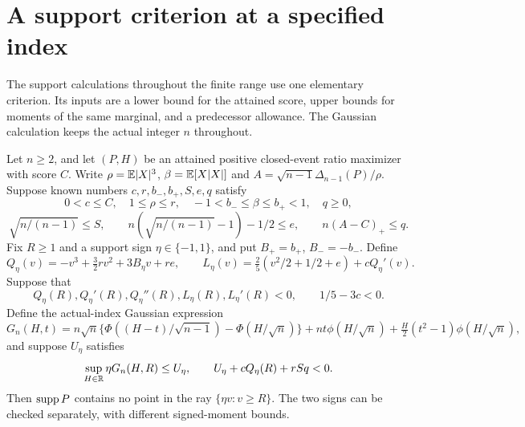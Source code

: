\section{A support criterion at a specified index}
\label{ext:direct-gaussian-support}
The support calculations throughout the finite range use one elementary
criterion. Its inputs are a lower bound for the attained score, upper
bounds for moments of the same marginal, and a predecessor allowance.
The Gaussian calculation keeps the actual integer $n$ throughout.

\begin{lemma}
\label{ext:direct-gaussian-support-criterion}
Let $n\ge2$, and let $(P,H)$ be an attained positive closed-event
ratio maximizer with score $C$. Write
$\rho=\mathbb E|X|^3$, $\beta=\mathbb E[X|X|]$ and
$A=\sqrt{n-1}\Delta_{n-1}(P)/\rho$.
Suppose known numbers $c,r,b_-,b_+,S,e,q$ satisfy
\[
 0<c\le C,\quad 1\le\rho\le r,\quad
 -1<b_-\le\beta\le b_+<1,\quad q\ge0,
\]
\[
 \sqrt{n/(n-1)}\le S,\qquad
 n(\sqrt{n/(n-1)}-1)-1/2\le e,\qquad
 n(A-C)_+\le q.
\]
Fix $R\ge1$ and a support sign $\eta\in\{-1,1\}$, and put
$B_+=b_+$, $B_-=-b_-$. Define
\[
 Q_\eta(v)=-v^3+\tfrac32rv^2+3B_\eta v+re,
 \qquad
 L_\eta(v)=\tfrac25(v^2/2+1/2+e)+cQ_\eta'(v).
\]
Suppose that
\begin{equation}\label{ext:direct-support-ray-gates}
 Q_\eta(R),Q_\eta'(R),Q_\eta''(R),
 L_\eta(R),L_\eta'(R)<0,
 \qquad 1/5-3c<0.
\end{equation}
Define the actual-index Gaussian expression
\[
 G_n(H,t)=n\sqrt n\{\Phi((H-t)/\sqrt{n-1})-\Phi(H/\sqrt n)\}
 +nt\phi(H/\sqrt n)+\tfrac H2(t^2-1)\phi(H/\sqrt n),
\]
and suppose $U_\eta$ satisfies
\[
 \sup_{H\in\mathbb R}\eta G_n(H,R)\le U_\eta,
 \qquad U_\eta+cQ_\eta(R)+rSq<0.
\]
Then $\operatorname{supp} P$ contains no point in the ray
$\{\eta v:v\ge R\}$. The two signs can be checked separately,
with different signed-moment bounds.
\end{lemma}

